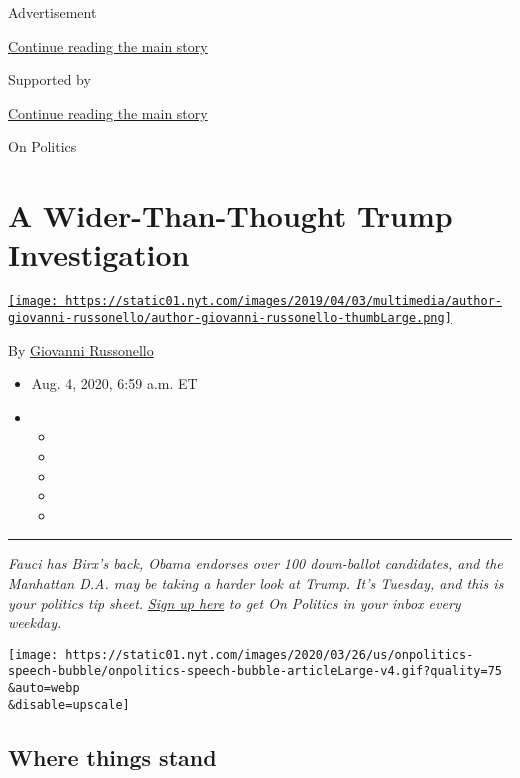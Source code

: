 Advertisement

\protect\hyperlink{after-top}{Continue reading the main story}

Supported by

\protect\hyperlink{after-sponsor}{Continue reading the main story}

On Politics

\hypertarget{a-wider-than-thought-trump-investigation}{%
\section{A Wider-Than-Thought Trump
Investigation}\label{a-wider-than-thought-trump-investigation}}

\href{https://www.nytimes.com/by/giovanni-russonello}{\texttt{[image: https://static01.nyt.com/images/2019/04/03/multimedia/author-giovanni-russonello/author-giovanni-russonello-thumbLarge.png]}}

By \href{https://www.nytimes.com/by/giovanni-russonello}{Giovanni
Russonello}

\begin{itemize}
\item
  Aug. 4, 2020, 6:59 a.m. ET
\item
  \begin{itemize}
  \item
  \item
  \item
  \item
  \item
  \end{itemize}
\end{itemize}

\begin{center}\rule{0.5\linewidth}{\linethickness}\end{center}

\emph{Fauci has Birx's back, Obama endorses over 100 down-ballot
candidates, and the Manhattan D.A. may be taking a harder look at Trump.
It's Tuesday, and this is your politics tip sheet.}
\href{https://www.nytimes.com/newsletters/politics?module=inline}{\emph{Sign
up here}} \emph{to get On Politics in your inbox every weekday.}

\texttt{[image: https://static01.nyt.com/images/2020/03/26/us/onpolitics-speech-bubble/onpolitics-speech-bubble-articleLarge-v4.gif?quality=75\\\&auto=webp\\\&disable=upscale]}

\hypertarget{where-things-stand}{%
\subsection{Where things stand}\label{where-things-stand}}

